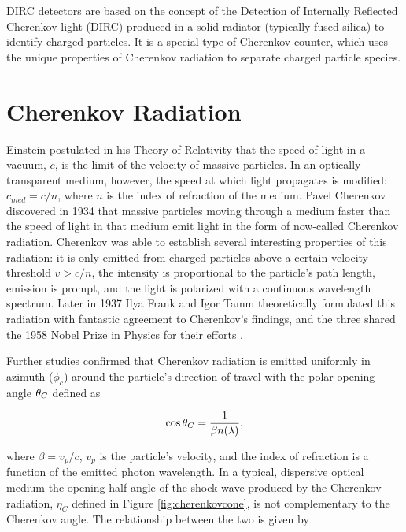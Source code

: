 \label{ch:dirc}
DIRC detectors are based on the concept of the Detection of Internally Reflected Cherenkov light (DIRC) produced in a solid radiator (typically fused silica) to identify charged particles. It is a special type of Cherenkov counter, which uses the unique properties of Cherenkov radiation to separate charged particle species.

\section{Cherenkov Radiation}
Einstein postulated in his Theory of Relativity that the speed of light in a vacuum, $c$, is the limit of the velocity of massive particles. In an optically transparent medium, however, the speed at which light propagates is modified: $c_{med} = c/n$, where $n$ is the index of refraction of the medium. Pavel Cherenkov discovered in 1934 that massive particles moving through a medium faster than the speed of light in that medium emit light in the form of now-called Cherenkov radiation. Cherenkov was able to establish several interesting properties of this radiation: it is only emitted from charged particles above a certain velocity threshold $v > c/n$, the intensity is proportional to the particle's path length, emission is prompt, and the light is polarized with a continuous wavelength spectrum. Later in 1937 Ilya Frank and Igor Tamm theoretically formulated this radiation with fantastic agreement to Cherenkov's findings, and the three shared the 1958 Nobel Prize in Physics for their efforts \cite{CherenkovHistory}.

Further studies confirmed that Cherenkov radiation is emitted uniformly in azimuth ($\phi_c$) around the particle's direction of travel with the polar opening angle $\theta_{C}$ defined as

\begin{equation}
	\cos\theta_{C} = \frac{1}{\beta n(\lambda)},
	\label{eq:cherenkovformula}
\end{equation}

where $\beta = v_p/c$, $v_p$ is the particle's velocity, and the index of refraction is a function of the emitted photon wavelength. In a typical, dispersive optical medium the opening half-angle of the shock wave produced by the Cherenkov radiation, $\eta_C$ defined in Figure \ref{fig:cherenkovcone}, is not complementary to the Cherenkov angle. The relationship between the two is given by

